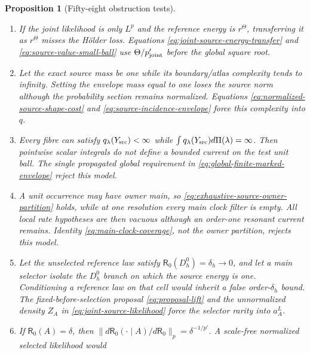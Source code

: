 \documentclass[11pt]{article}
\newtheorem{proposition}[theorem]{Proposition}
\begin{document}
\begin{proposition}[Fifty-eight obstruction tests]
\begin{enumerate}[label=\textup{(T\arabic*)}]
      $\kappa={\rm Leb}$, $\nu=\delta_0$, and $S(x)=x$.  The Jacobian is one
      and the slopes match exactly, but
      $\nu\not\ll H_*\kappa$; reference energy is $O(h)$ while source energy
      is one.  The pushforward law and RN condition
      \eqref{eq:carrier-match-pushforward-law}--
      \eqref{eq:carrier-match-density-ratio}, not a bounded Jacobian alone,
      reject it.
\item If the joint likelihood is only $L^p$ and the reference energy is
      $r^\Theta$, transferring it as $r^\Theta$ misses the H\"older loss.
      Equations \eqref{eq:joint-source-energy-transfer} and
      \eqref{eq:source-value-small-ball} use
      $\Theta/p_{\rm joint}'$ before the global square root.
\item Let the exact source mass be one while its boundary/atlas complexity
      tends to infinity.  Setting the envelope mass equal to one loses the
      source norm although the probability section remains normalized.
      Equations \eqref{eq:normalized-source-shape-cost} and
      \eqref{eq:source-incidence-envelope} force this complexity into $q$.
\item Every fibre can satisfy $q_\lambda(Y_{\rm src})<\infty$ while
      $\int q_\lambda(Y_{\rm src})d\Pi(\lambda)=\infty$.  Then pointwise
      scalar integrals do not define a bounded current on the test unit ball.
      The single propagated global requirement in
      \eqref{eq:global-finite-marked-envelope} reject this model.
\item A unit occurrence may have owner main, so
      \eqref{eq:exhaustive-source-owner-partition} holds, while at one
      resolution every main clock filter is empty.  All local rate hypotheses
      are then vacuous although an order-one resonant current remains.
      Identity \eqref{eq:main-clock-coverage}, not the owner partition,
      rejects this model.
\item Let the unselected reference law satisfy
      $\mathsf R_0(D_h^0)=\delta_h\to0$, and let a main selector isolate the
      $D_h^0$ branch on which the source energy is one.  Conditioning a
      reference law on that cell would inherit a false order-$\delta_h$
      bound.  The fixed-before-selection proposal
      \eqref{eq:proposal-lift} and the unnormalized density $Z_A$ in
      \eqref{eq:joint-source-likelihood} force the selector rarity into
      $a_A^L$.
\item If $\mathsf R_0(A)=\delta$, then
      $\|d\mathsf R_0(\cdot\mid A)/d\mathsf R_0\|_p
       =\delta^{-1/p'}$.  A scale-free normalized selected likelihood would

\end{enumerate}
\end{proposition}
\end{document}
